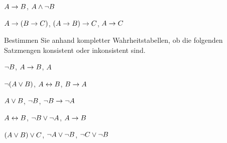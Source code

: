 \begin{earg}
% 
%


\item $A \rightarrow B$, $A \wedge \neg B$\vspace{.5ex} %

\item $A \rightarrow (B \rightarrow C)$, $(A \rightarrow B) \rightarrow C$, $A \rightarrow C$\vspace{.5ex} %

\end{earg}

\noindent\problempart
\label{pr.TT.satisfiable3}
Bestimmen Sie anhand kompletter Wahrheitstabellen, ob die folgenden Satzmengen konsistent oder inkonsistent sind.
\begin{earg}
\item $\neg B$, $A \rightarrow B$, $A$ \vspace{.5ex}%
\item $\neg(A \vee B)$, $A \leftrightarrow B$, $B \rightarrow A$\vspace{.5ex} %
\item $A \vee B$, $\neg B$, $\neg B \rightarrow \neg A$\vspace{.5ex} %
\item $A \leftrightarrow B$, $\neg B \vee \neg A$, $A \rightarrow B$\vspace{.5ex} %
\item $(A \vee B) \vee C$, $\neg A \vee \neg B$, $\neg C \vee \neg B$\vspace{.5ex} %
\end{earg}




